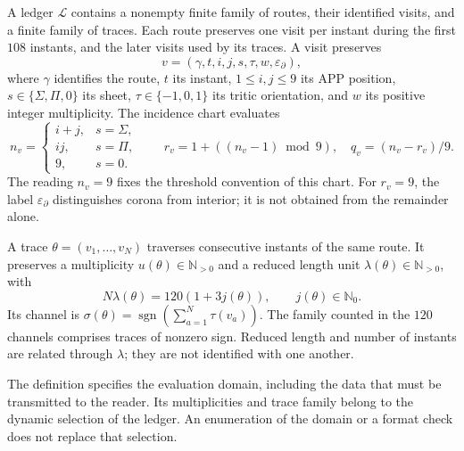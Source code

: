 \begin{definition}
\label{vi:dep:libro-dominio}
A ledger \(\mathscr L\) contains a nonempty finite family of routes,
their identified visits, and a finite family of traces. Each route
preserves one visit per instant during the first \(108\) instants,
and the later visits used by its traces. A visit preserves
\[
 v=(\gamma,t,i,j,s,\tau,w,\varepsilon_\partial),
\]
where \(\gamma\) identifies the route, \(t\) its instant, \(1\le i,j\le9\)
its APP position, \(s\in\{\Sigma,\Pi,0\}\) its sheet,
\(\tau\in\{-1,0,1\}\) its tritic orientation, and \(w\) its positive
integer multiplicity. The incidence chart evaluates
\[
 n_v=
 \begin{cases}
 i+j,&s=\Sigma,\\
 ij,&s=\Pi,\\
 9,&s=0.
 \end{cases}
 \qquad
 r_v=1+((n_v-1)\bmod9),\quad q_v=(n_v-r_v)/9.
\]
The reading \(n_v=9\) fixes the threshold convention of this chart.
For \(r_v=9\), the label \(\varepsilon_\partial\) distinguishes
corona from interior; it is not obtained from the remainder alone.

A trace \(\theta=(v_1,\ldots,v_N)\) traverses consecutive instants of
the same route. It preserves a multiplicity \(u(\theta)\in\mathbb N_{>0}\)
and a reduced length unit
\(\lambda(\theta)\in\mathbb N_{>0}\), with
\[
 N\lambda(\theta)=120(1+3j(\theta)),\qquad j(\theta)\in\mathbb N_0.
\]
Its channel is
\(\sigma(\theta)=\operatorname{sgn}(\sum_{a=1}^N\tau(v_a))\).
The family counted in the \(120\) channels comprises traces of
nonzero sign. Reduced length and number of instants are
related through \(\lambda\); they are not identified with one another.
\end{definition}

The definition specifies the evaluation domain, including the
data that must be transmitted to the reader. Its multiplicities and trace
family belong to the dynamic selection of the ledger. An enumeration
of the domain or a format check does not replace that selection.

